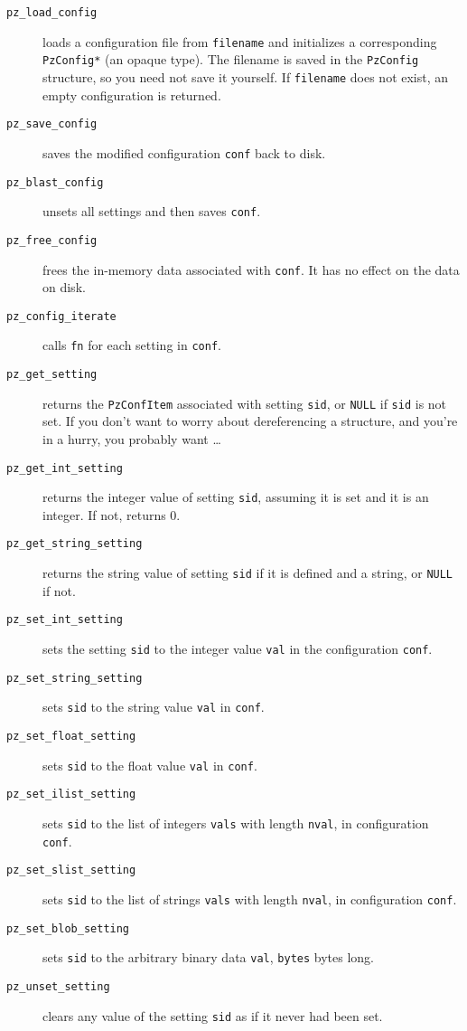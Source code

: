 \documentclass[12pt,letterpaper]{report}
\let\ttt\tt
\def\tt{\def\_{{\ttt\char`\_}}\ttt}
\begin{document}
\begin{description}
\item[{\tt pz_load_config}] loads a configuration file from \verb|filename| and initializes a
corresponding \verb|PzConfig*| (an opaque type). The filename is saved in the \verb|PzConfig|
structure, so you need not save it yourself. If \verb|filename| does not exist, an empty
configuration is returned.
\item[{\tt pz_save_config}] saves the modified configuration \verb|conf| back to disk.
\item[{\tt pz_blast_config}] unsets all settings and then saves \verb|conf|.
\item[{\tt pz_free_config}] frees the in-memory data associated with \verb|conf|. It has
no effect on the data on disk.
\item[{\tt pz_config_iterate}] calls \verb|fn| for each setting in \verb|conf|.
\vskip6pt
\item[{\tt pz_get_setting}] returns the \verb|PzConfItem| associated with setting \verb|sid|,
or \verb|NULL| if \verb|sid| is not set. If you don't want to worry about dereferencing a structure,
and you're in a hurry, you probably want \ldots
\item[{\tt pz_get_int_setting}] returns the integer value of setting \verb|sid|, assuming it is set
and it is an integer. If not, returns 0.
\item[{\tt pz_get_string_setting}] returns the string value of setting \verb|sid| if it is defined
and a string, or \verb|NULL| if not.
\vskip6pt
\item[{\tt pz_set_int_setting}] sets the setting \verb|sid| to the integer value \verb|val| in
the configuration \verb|conf|.
\item[{\tt pz_set_string_setting}] sets \verb|sid| to the string value \verb|val| in \verb|conf|.
\item[{\tt pz_set_float_setting}] sets \verb|sid| to the float value \verb|val| in \verb|conf|.
\item[{\tt pz_set_ilist_setting}] sets \verb|sid| to the list of integers \verb|vals| with length \verb|nval|, in configuration \verb|conf|.
\item[{\tt pz_set_slist_setting}] sets \verb|sid| to the list of strings \verb|vals| with length \verb|nval|, in configuration \verb|conf|.
\item[{\tt pz_set_blob_setting}] sets \verb|sid| to the arbitrary binary data \verb|val|, \verb|bytes| bytes long.
\vskip6pt
\item[{\tt pz_unset_setting}] clears any value of the setting \verb|sid| as if it never had been set.
\end{description}
\end{document}

